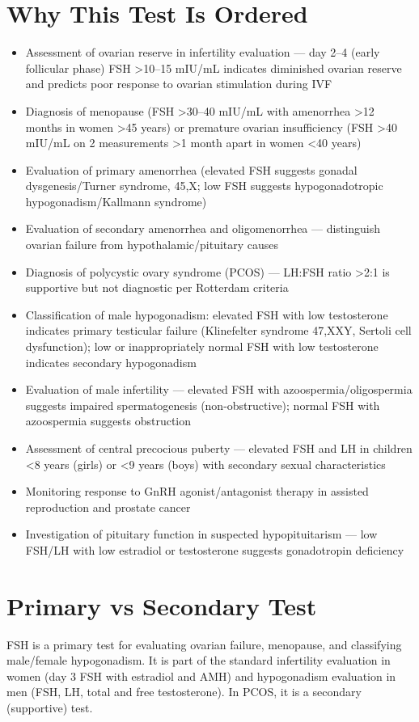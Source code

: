 \section*{Why This Test Is Ordered}
\begin{itemize}
  \item Assessment of ovarian reserve in infertility evaluation --- day 2--4 (early follicular phase) FSH >10--15 mIU/mL indicates diminished ovarian reserve and predicts poor response to ovarian stimulation during IVF \cite{asrm2020testing}
  \item Diagnosis of menopause (FSH >30--40 mIU/mL with amenorrhea >12 months in women >45 years) or premature ovarian insufficiency (FSH >40 mIU/mL on 2 measurements >1 month apart in women <40 years) \cite{webber2016eshre}
  \item Evaluation of primary amenorrhea (elevated FSH suggests gonadal dysgenesis/Turner syndrome, 45,X; low FSH suggests hypogonadotropic hypogonadism/Kallmann syndrome)
  \item Evaluation of secondary amenorrhea and oligomenorrhea --- distinguish ovarian failure from hypothalamic/pituitary causes
  \item Diagnosis of polycystic ovary syndrome (PCOS) --- LH:FSH ratio >2:1 is supportive but not diagnostic per Rotterdam criteria \cite{rotterdam2004revised}
  \item Classification of male hypogonadism: elevated FSH with low testosterone indicates primary testicular failure (Klinefelter syndrome 47,XXY, Sertoli cell dysfunction); low or inappropriately normal FSH with low testosterone indicates secondary hypogonadism
  \item Evaluation of male infertility --- elevated FSH with azoospermia/oligospermia suggests impaired spermatogenesis (non-obstructive); normal FSH with azoospermia suggests obstruction
  \item Assessment of central precocious puberty --- elevated FSH and LH in children <8 years (girls) or <9 years (boys) with secondary sexual characteristics
  \item Monitoring response to GnRH agonist/antagonist therapy in assisted reproduction and prostate cancer
  \item Investigation of pituitary function in suspected hypopituitarism --- low FSH/LH with low estradiol or testosterone suggests gonadotropin deficiency
\end{itemize}

\section*{Primary vs Secondary Test}
FSH is a primary test for evaluating ovarian failure, menopause, and classifying male/female hypogonadism. It is part of the standard infertility evaluation in women (day 3 FSH with estradiol and AMH) and hypogonadism evaluation in men (FSH, LH, total and free testosterone). In PCOS, it is a secondary (supportive) test.

